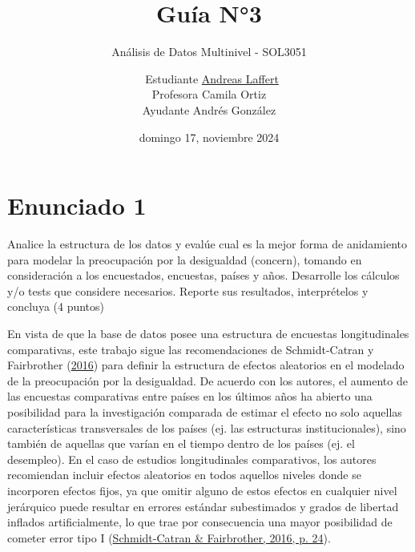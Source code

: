 \documentclass[
  12pt,
  a4paper,
]{article}
\title{\vspace{5cm} Guía N°3}
\subtitle{Análisis de Datos Multinivel - SOL3051}
\author{~Estudiante \href{mailto:alaffertt@estudiante.uc.cl}{Andreas Laffert}\\
\hspace*{0.333em}Profesora Camila Ortiz\\
Ayudante Andrés González\\
\vspace{8cm}}
\date{domingo 17, noviembre 2024}
\begin{document}
\maketitle

\pagebreak

\hypertarget{enunciado-1}{%
\section{Enunciado 1}\label{enunciado-1}}

Analice la estructura de los datos y evalúe cual es la mejor forma de anidamiento para modelar la preocupación por la desigualdad (concern), tomando en consideración a los encuestados, encuestas, países y años. Desarrolle los cálculos y/o tests que considere necesarios. Reporte sus resultados, interprételos y concluya (4 puntos)

En vista de que la base de datos posee una estructura de encuestas longitudinales comparativas, este trabajo sigue las recomendaciones de Schmidt-Catran y Fairbrother (\protect\hyperlink{ref-schmidt-catranRandomEffectsMultilevel2016}{2016}) para definir la estructura de efectos aleatorios en el modelado de la preocupación por la desigualdad. De acuerdo con los autores, el aumento de las encuestas comparativas entre países en los últimos años ha abierto una posibilidad para la investigación comparada de estimar el efecto no solo aquellas características transversales de los países (ej. las estructuras institucionales), sino también de aquellas que varían en el tiempo dentro de los países (ej. el desempleo). En el caso de estudios longitudinales comparativos, los autores recomiendan incluir efectos aleatorios en todos aquellos niveles donde se incorporen efectos fijos, ya que omitir alguno de estos efectos en cualquier nivel jerárquico puede resultar en errores estándar subestimados y grados de libertad inflados artificialmente, lo que trae por consecuencia una mayor posibilidad de cometer error tipo I (\protect\hyperlink{ref-schmidt-catranRandomEffectsMultilevel2016}{Schmidt-Catran \& Fairbrother, 2016, p. 24}).
\end{document}
